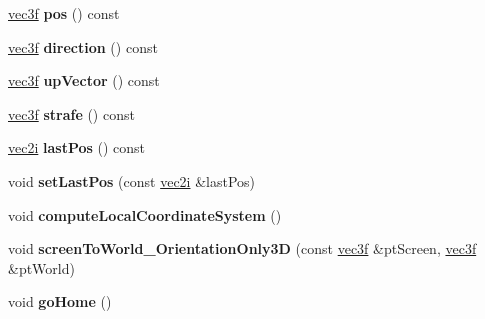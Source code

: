 \begin{DoxyCompactItemize}
\item 
\hypertarget{classps_1_1scene_1_1ArcBallCamera_a5a5923f24d2bd9ed9574464d6df2b919}{}\hyperlink{classps_1_1base_1_1Vec3}{vec3f} {\bfseries pos} () const \label{classps_1_1scene_1_1ArcBallCamera_a5a5923f24d2bd9ed9574464d6df2b919}

\item 
\hypertarget{classps_1_1scene_1_1ArcBallCamera_a18e81e3f76219a1b551cac30d4bf5f0a}{}\hyperlink{classps_1_1base_1_1Vec3}{vec3f} {\bfseries direction} () const \label{classps_1_1scene_1_1ArcBallCamera_a18e81e3f76219a1b551cac30d4bf5f0a}

\item 
\hypertarget{classps_1_1scene_1_1ArcBallCamera_a770aec80b0ca6f7d2c7596d260f91d73}{}\hyperlink{classps_1_1base_1_1Vec3}{vec3f} {\bfseries up\+Vector} () const \label{classps_1_1scene_1_1ArcBallCamera_a770aec80b0ca6f7d2c7596d260f91d73}

\item 
\hypertarget{classps_1_1scene_1_1ArcBallCamera_a88ca6503a727f01ea624c99c56908775}{}\hyperlink{classps_1_1base_1_1Vec3}{vec3f} {\bfseries strafe} () const \label{classps_1_1scene_1_1ArcBallCamera_a88ca6503a727f01ea624c99c56908775}

\item 
\hypertarget{classps_1_1scene_1_1ArcBallCamera_a83dfa569db495758c6335dbb4fa7b904}{}\hyperlink{classps_1_1base_1_1Vec2}{vec2i} {\bfseries last\+Pos} () const \label{classps_1_1scene_1_1ArcBallCamera_a83dfa569db495758c6335dbb4fa7b904}

\item 
\hypertarget{classps_1_1scene_1_1ArcBallCamera_a4b136f05455f657f65dd51fc7f9e34a0}{}void {\bfseries set\+Last\+Pos} (const \hyperlink{classps_1_1base_1_1Vec2}{vec2i} \&last\+Pos)\label{classps_1_1scene_1_1ArcBallCamera_a4b136f05455f657f65dd51fc7f9e34a0}

\item 
\hypertarget{classps_1_1scene_1_1ArcBallCamera_a9b816ded6e436b8842fc9e94be354a7a}{}void {\bfseries compute\+Local\+Coordinate\+System} ()\label{classps_1_1scene_1_1ArcBallCamera_a9b816ded6e436b8842fc9e94be354a7a}

\item 
\hypertarget{classps_1_1scene_1_1ArcBallCamera_a2db509532bb2c8274ae099644e76a45a}{}void {\bfseries screen\+To\+World\+\_\+\+Orientation\+Only3\+D} (const \hyperlink{classps_1_1base_1_1Vec3}{vec3f} \&pt\+Screen, \hyperlink{classps_1_1base_1_1Vec3}{vec3f} \&pt\+World)\label{classps_1_1scene_1_1ArcBallCamera_a2db509532bb2c8274ae099644e76a45a}

\item 
\hypertarget{classps_1_1scene_1_1ArcBallCamera_aa519f086c713c26d53d98b331dc4f85f}{}void {\bfseries go\+Home} ()\label{classps_1_1scene_1_1ArcBallCamera_aa519f086c713c26d53d98b331dc4f85f}

\end{DoxyCompactItemize}
